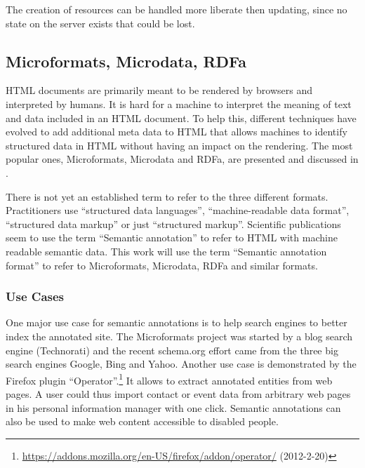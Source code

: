 \documentclass[12pt,a4paper,twoside]{scrartcl}		%
\newcommand{\citeurl}[2]{\url{#1} (#2)}
\begin{document}
The creation of resources can be handled more liberate then updating, since no
state on the server exists that could be lost.


\subsection{Microformats, Microdata, RDFa}
\label{sec:microdata}

HTML documents are primarily meant to be rendered by browsers and interpreted by
humans. It is hard for a machine to interpret the meaning of text and data
included in an HTML document. To help this, different techniques have evolved to
add additional meta data to HTML that allows machines to identify structured
data in HTML without having an impact on the rendering. The most popular ones,
Microformats, Microdata and RDFa, are presented and discussed in
\cite{Tennison2012}.

There is not yet an established term to refer to the three different
formats. Practitioners use ``structured data languages''\cite{Sporny2011},
``machine-readable data format''\cite{Hickson2011}, ``structured data
markup''\cite{Goel2011} or just ``structured markup''. Scientific publications
seem to use the term ``Semantic annotation''\cite{instance7} to refer to HTML
with machine readable semantic data. This work will use the term ``Semantic
annotation format'' to refer to Microformats, Microdata, RDFa and similar
formats.

\subsubsection{Use Cases}
\label{sec:semantic-anno-use-cases}

One major use case for semantic annotations is to help search engines to better
index the annotated site. The Microformats project was started by a blog search
engine (Technorati)\cite{Celik2006} and the recent schema.org effort came from
the three big search engines Google, Bing and Yahoo.\cite{Goel2011} Another use
case is demonstrated by the Firefox plugin
``Operator''.\footnote{\citeurl{https://addons.mozilla.org/en-US/firefox/addon/operator/}{2012-2-20}}
It allows to extract annotated entities from web pages. A user could thus import
contact or event data from arbitrary web pages in his personal information
manager with one click. Semantic annotations can also be used to make web
content accessible to disabled people\cite{Yesilada:2007:EDS:1279700.1279704}.
\end{document}
